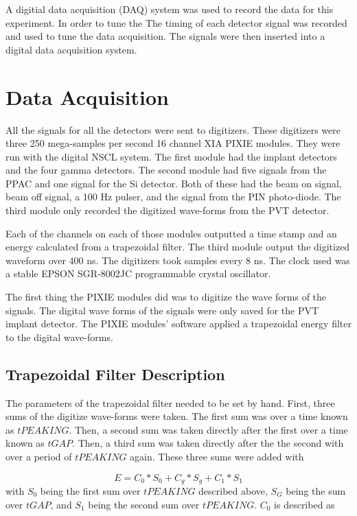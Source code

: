 \documentclass[main.tex]{subfiles}
\begin{document}
A digitial data acquisition (DAQ) system was used to record the data for this experiment.
In order to tune the 
The timing of each detector signal was recorded and used to tune the data acquisition. 
The signals were then inserted into a digital data acquisition system.

\section{Data Acquisition}

All the signals for all the detectors were sent to digitizers.
These digitizers were three 250 mega-samples per second 16 channel XIA PIXIE modules. 
They were run with the digital NSCL system.
The first module had the implant detectors and the four gamma detectors. 
The second module had five signals from the PPAC and one signal for the Si detector. 
Both of these had the beam on signal, beam off signal, a 100 Hz pulser, and the signal from the PIN photo-diode. 
The third module only recorded the digitized wave-forms from the PVT detector.

Each of the channels on each of those modules outputted a time stamp and an energy calculated from a trapezoidal filter.
The third module output the digitized waveform over 400 ns.
The digitizers took samples every 8 ns.
The clock used was a stable EPSON SGR-8002JC programmable crystal oscillator.

The first thing the PIXIE modules did was to digitize the wave forms of the signals.
The digital wave forms of the signals were only saved for the PVT implant detector.
The PIXIE modules' software applied a trapezoidal energy filter to the digital wave-forms.

\subsection{Trapezoidal Filter Description}
The parameters of the trapezoidal filter needed to be set by hand.
First, three sums of the digitize wave-forms were taken.
The first sum was over a time known as $tPEAKING$.
Then, a second sum was taken directly after the first over a time known as $tGAP$.
Then, a third sum was taken directly after the the second with over a period of $tPEAKING$ again.
These three sums were added with 

\begin{equation}
	E = C_{0} * S_{0} + C_{g} * S_{g} + C_{1} * S_{1} 
	\label{eq:ensum}
\end{equation} 
%
with $S_{0}$ being the first sum over $tPEAKING$ described above, $S_{G}$ being the sum over $tGAP$, and $S_{1}$ being the second sum over $tPEAKING$.
$C_{0}$ is described as
\end{document}
